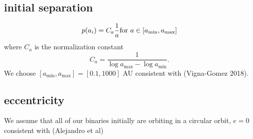 \subsection{initial separation}
%
\begin{equation}
	p(a_i) = C_a \frac{1}{a} \vspace{2cm} \text{for } a \in [a_{\text{min}}, a_{\text{max}}] 
\end{equation}
%
where $C_a$ is the normalization constant
%
\begin{equation}
C_a = \frac{1}{\log a_{\text{max}} - \log a_{\text{min}}}.	
\end{equation}
% 
We choose $[a_{\text{min}}, a_{\text{max}}]  = [0.1, 1000]$ AU consistent with (Vigna-Gomez 2018).



\subsection{eccentricity}
We assume that all of our binaries initially are orbiting in a circular orbit, $e = 0$ consistent with (Alejandro et al) 

